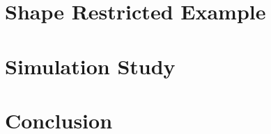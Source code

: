 \documentclass[12pt]{article}
\begin{document}
\section{Shape Restricted Example}
\label{Shape Restricted Example}












\section{Simulation Study}
\label{Simulation Study}


\section{Conclusion}
\label{Conclusion}




\end{document}

